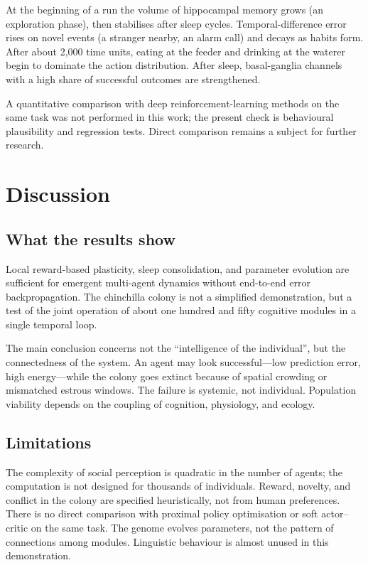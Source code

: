 \documentclass[11pt,a4paper]{article}
\begin{document}
At the beginning of a run the volume of hippocampal memory grows (an exploration phase), then stabilises after sleep cycles. Temporal-difference error rises on novel events (a stranger nearby, an alarm call) and decays as habits form. After about 2{,}000 time units, eating at the feeder and drinking at the waterer begin to dominate the action distribution. After sleep, basal-ganglia channels with a high share of successful outcomes are strengthened.

A quantitative comparison with deep reinforcement-learning methods on the same task was not performed in this work; the present check is behavioural plausibility and regression tests. Direct comparison remains a subject for further research.

\section{Discussion}

\subsection{What the results show}

Local reward-based plasticity, sleep consolidation, and parameter evolution are sufficient for emergent multi-agent dynamics without end-to-end error backpropagation. The chinchilla colony is not a simplified demonstration, but a test of the joint operation of about one hundred and fifty cognitive modules in a single temporal loop.

The main conclusion concerns not the ``intelligence of the individual'', but the connectedness of the system. An agent may look successful---low prediction error, high energy---while the colony goes extinct because of spatial crowding or mismatched estrous windows. The failure is systemic, not individual. Population viability depends on the coupling of cognition, physiology, and ecology.

\subsection{Limitations}

The complexity of social perception is quadratic in the number of agents; the computation is not designed for thousands of individuals. Reward, novelty, and conflict in the colony are specified heuristically, not from human preferences. There is no direct comparison with proximal policy optimisation or soft actor--critic on the same task. The genome evolves parameters, not the pattern of connections among modules. Linguistic behaviour is almost unused in this demonstration.
\end{document}
